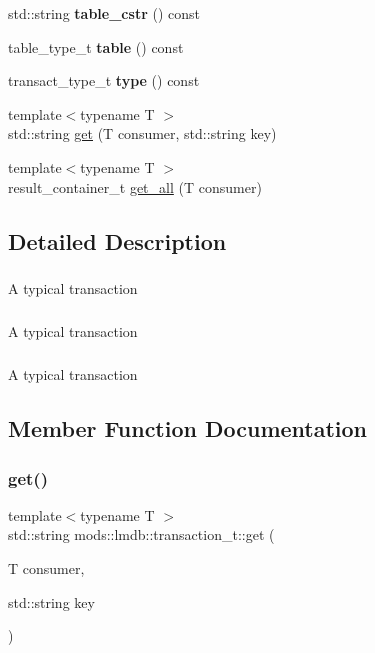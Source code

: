 \begin{DoxyCompactItemize}
std\+::string {\bfseries table\+\_\+cstr} () const
\item 
\mbox{\label{structmods_1_1lmdb_1_1transaction__t_a812dc866044aead9677b8a4e4e632975}} 
table\+\_\+type\+\_\+t {\bfseries table} () const
\item 
\mbox{\label{structmods_1_1lmdb_1_1transaction__t_ae581e7f664485009158f09151e134988}} 
transact\+\_\+type\+\_\+t {\bfseries type} () const
\item 
{\footnotesize template$<$typename T $>$ }\\std\+::string \hyperlink{structmods_1_1lmdb_1_1transaction__t_a893faeea3f9f9a0875d0522c6c7de5b6}{get} (T consumer, std\+::string key)
\item 
{\footnotesize template$<$typename T $>$ }\\result\+\_\+container\+\_\+t \hyperlink{structmods_1_1lmdb_1_1transaction__t_a89e078b5a572044e71ee239589ea334f}{get\+\_\+all} (T consumer)
\end{DoxyCompactItemize}


\subsection{Detailed Description}
\subparagraph*{}

A typical transaction \subparagraph*{}

\subparagraph*{}

A typical transaction \subparagraph*{}

\subparagraph*{}

A typical transaction \subparagraph*{}

\subsection{Member Function Documentation}
\mbox{\label{structmods_1_1lmdb_1_1transaction__t_a893faeea3f9f9a0875d0522c6c7de5b6}} 
\subsubsection{\texorpdfstring{get()}{get()}}
{\footnotesize\ttfamily template$<$typename T $>$ \\
std\+::string mods\+::lmdb\+::transaction\+\_\+t\+::get (\begin{DoxyParamCaption}\item[{T}]{consumer,  }\item[{std\+::string}]{key }\end{DoxyParamCaption})}

